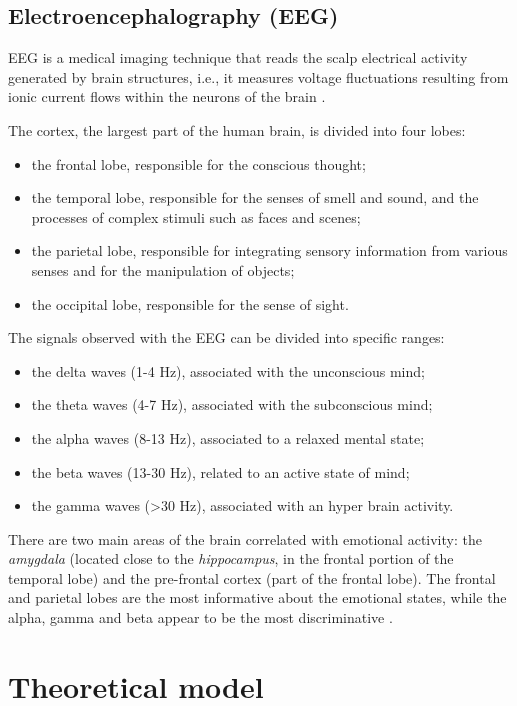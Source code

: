\documentclass[10pt,journal,A4paper,compsoc,epsfig]{IEEEtran}
\begin{document}
\subsection{Electroencephalography (EEG)}
EEG is a medical imaging technique that reads the scalp electrical activity generated by brain structures, i.e., it measures voltage fluctuations resulting from ionic current flows within the neurons of the brain \cite{alarcao2017emotions}.

The cortex, the largest part of the human brain, is divided into four lobes:
\begin{itemize}
\item the frontal lobe, responsible for the conscious thought;
\item the temporal lobe, responsible for the senses of smell and sound, and the processes of complex stimuli such as faces and scenes;
\item the parietal lobe, responsible for integrating sensory information from various senses and for the manipulation of objects;
\item the occipital lobe, responsible for the sense of sight.
\end{itemize}

The signals observed with the EEG can be divided into specific ranges:
\begin{itemize}
\item the delta waves (1-4 Hz), associated with the unconscious mind;
\item the theta waves (4-7 Hz), associated with the subconscious mind;
\item the alpha waves (8-13 Hz), associated to a relaxed mental state;
\item the beta waves (13-30 Hz), related to an active state of mind;
\item the gamma waves (>30 Hz), associated with an hyper brain activity.
\end{itemize}

There are two main areas of the brain correlated with emotional activity: the \textit{amygdala} (located close to the \textit{hippocampus}, in the frontal portion of the temporal lobe) and the pre-frontal cortex (part of the frontal lobe).
The frontal and parietal lobes are the most informative about the emotional states, while the alpha, gamma and beta appear to be the most discriminative \cite{alarcao2017emotions}.


\section{Theoretical model}
 \label{model}
 
\end{document}
